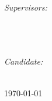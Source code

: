 \begin{titlepage}
\begin{center}
\begin{minipage}[t]{0.4\textwidth}
\begin{flushleft} \large
\emph{Supervisors:} \\[0.2cm]
\supname\\[0.3cm] %
\cosupname\\[0.3cm] %
\cocosupname\\[0.3cm] %
\cococosupname %
\end{flushleft}
\end{minipage}
\begin{minipage}[t]{0.4\textwidth}
\begin{flushright} \large
\emph{Candidate:}\\[0.2cm]
\authorname %
\end{flushright}
\end{minipage}\\[1cm]

{\large \monthyeardate\today}\\[4cm] %
 
\end{center}
\end{titlepage}